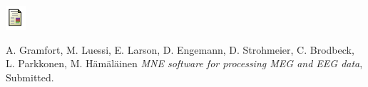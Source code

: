 \documentclass[t,11pt,compress]{beamer} %
\newcommand{\vfillll}{\vfilll\vfilll\vfilll\vfilll\vfilll\vfilll\vfilll\vfilll\vfilll\vfilll\vfilll\vfilll\vfilll\vfilll\vfilll\vfilll\vfilll\vfilll\vfilll\vfilll\vfilll\vfilll\vfilll\vfilll\vfilll\vfilll\vfilll\vfilll\vfilll\vfilll\vfilll\vfilll\vfilll\vfilll\vfilll\vfilll\vfilll\vfilll\vfilll\vfilll}
\begin{document}
\begin{frame}[plain,t,c]
\begin{minipage}{\linewidth}
\smallskip
\centering
\begin{minipage}{0.05\linewidth}
    \includegraphics[width=0.9\linewidth]{paper_logo.pdf}%
\end{minipage}
\begin{minipage}{0.87\linewidth}
    A. Gramfort, M. Luessi, E. Larson, D. Engemann, D. Strohmeier, C. Brodbeck, L. Parkkonen, M. H\"am\"al\"ainen\hfill
    \emph{MNE software for processing MEG and EEG data}, Submitted.
\end{minipage}
\end{minipage}




\end{frame}
\end{document}
